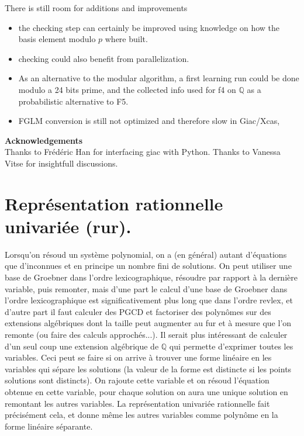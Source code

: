 \documentclass[a4paper,11pt]{book}
\begin{document}
\begin{giacjshere}
There is still room for additions and improvements
\begin{itemize}
\item the checking step can certainly be improved using
knowledge on how the basis element modulo $p$ where
built.
\item checking could also benefit from parallelization.
\item As an alternative to the modular algorithm,
a first learning run could be done modulo a 24 bits prime, and
the collected info used for f4 on $\mathbb{Q}$ as a probabilistic alternative
to F5.
\item FGLM conversion is still not optimized and therefore
slow in Giac/Xcas, 
\end{itemize}


{\bf Acknowledgements} \\
Thanks to Fr\'ed\'eric Han for interfacing giac with Python.
Thanks to Vanessa Vitse for insightfull discussions.



\section{Représentation rationnelle univariée 
(rur).}
\label{sec:rur}
Lorsqu'on résoud un système polynomial, on a (en général) autant
d'équations que d'inconnues et en principe un nombre fini de solutions.
On peut utiliser une base de Groebner dans l'ordre lexicographique,
résoudre par rapport à la dernière variable, puis remonter, mais
d'une part le calcul d'une base de Groebner dans l'ordre lexicographique
est significativement plus long que dans l'ordre revlex, et d'autre
part il faut calculer des PGCD et 
factoriser des polynômes sur des extensions algébriques
dont la taille peut augmenter au fur et à mesure que l'on remonte (ou faire
des calculs approchés...). Il serait plus intéressant de calculer
d'un seul coup une extension algébrique de $\mathbb{Q}$ qui permette
d'exprimer toutes les variables. Ceci peut se faire si on arrive à
trouver une forme linéaire en les variables qui sépare
les solutions (la valeur de la forme est distincte si les points
solutions sont distincts). On rajoute cette variable et on résoud
l'équation obtenue en cette variable, pour chaque solution on aura
une unique solution en remontant les autres variables. La représentation
univariée rationnelle fait précisément cela, et donne même les
autres variables comme polynôme en la forme linéaire séparante.


\end{giacjshere}
\end{document}
